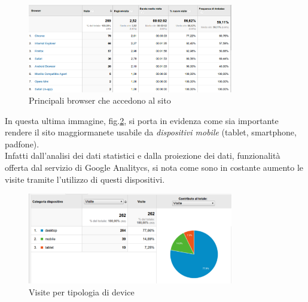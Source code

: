 \documentclass[a4paper,12pt,hidelinks]{report}
\begin{document}
  \begin{figure}[h!]%
    \includegraphics[width=0.80\textwidth,keepaspectratio=true]{../img/googleAnalyticsBrowser}
    \centering
    \caption{Principali browser che accedono al sito}%
    \label{fig:googleAnalyticsBrowser}%
  \end{figure}
  \newpage
  \par In questa ultima immagine, fig.\ref{fig:googleTecnologia}, si porta in evidenza come sia importante rendere il sito maggiormanete usabile da \textit{dispositivi mobile} (tablet, smartphone,
  padfone). 
  \\Infatti dall'analisi dei dati statistici e dalla proiezione dei dati, funzionalità offerta dal servizio di Google Analitycs, si nota come sono in costante 
  aumento le visite tramite l'utilizzo di questi dispositivi.
  \begin{figure}[h!]%
    \includegraphics[width=0.80\textwidth,keepaspectratio=true]{../img/googleTecnologia}
    \centering
    \caption{Visite per tipologia di device}%
    \label{fig:googleTecnologia}%
  \end{figure}
\end{document}
